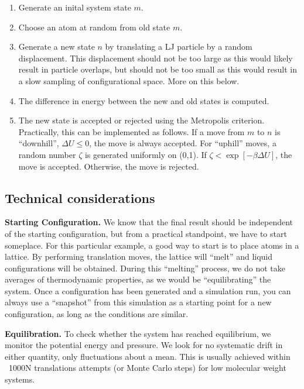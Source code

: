 \documentclass[aip,jcp,preprint,superscriptaddress,floatfix]{revtex4-1}
\begin{document}
\begin{enumerate}
\item Generate an inital system state $m$.
\item Choose an atom at random from old state $m$.
\item Generate a new state $n$ by
	translating a LJ particle by a random displacement.
	This displacement should not be too large as this would
	likely result in particle overlaps, but should not be too small
	as this would result in a slow sampling of configurational space.
	More on this below.
\item The difference in energy between the new and old states is computed.
\item The new state is accepted or rejected using the Metropolis criterion.
	Practically, this can be implemented as follows. 
	If a move from $m$ to $n$ is ``downhill'', $\Delta U \leq 0$,
	the move is always accepted. For ``uphill'' moves, a random
	number $\zeta$ is generated uniformly on (0,1).  If $\zeta <
	\exp[-\beta {\Delta U}]$, the move is
	accepted.  Otherwise, the move is rejected. 
\end{enumerate}

\subsection{Technical considerations}

\textbf{Starting Configuration.} We
know that the final result should be independent of the starting
configuration, but from a practical standpoint, we have to start someplace. 
For this particular example, a good way to start is to place atoms
in a lattice. By performing translation moves, the lattice will ``melt''
and liquid configurations will be obtained. During this ``melting'' process, 
we do not take averages of thermodynamic properties, as we would be 
``equilibrating'' the system.
Once a configuration has been generated and a simulation run, you
can always use a ``snapshot'' from this simulation as a starting point for a
new configuration, as long as the conditions are similar.

\textbf{Equilibration.} To check whether the system has reached equilibrium, we 
monitor the potential energy and pressure.  We look for 
no systematic drift in either quantity, only 
fluctuations about a mean. This is usually achieved within ~1000N
translations attempts (or Monte Carlo steps) for low molecular weight
systems.
\end{document}
